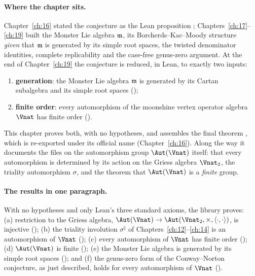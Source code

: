 \paragraph{Where the chapter sits.}  Chapter~\ref{ch:16} stated the
conjecture as the Lean proposition ; Chapters~\ref{ch:17}--\ref{ch:19} built the Monster
Lie algebra $\mathfrak m$, its Borcherds--Kac--Moody structure \emph{given} that $\mathfrak m$ is generated by its
simple root spaces, the twisted denominator identities, complete replicability and the case-free genus-zero
argument.  At the end of Chapter~\ref{ch:19} the conjecture is reduced, in Lean, to exactly two inputs:
\begin{enumerate}[label=(\Roman*)]
\item \textbf{generation}: the Monster Lie algebra $\mathfrak m$ is generated by its Cartan subalgebra and its
  simple root spaces ();
\item \textbf{finite order}: every automorphism of the moonshine vertex operator algebra $\Vnat$ has finite order
  ().
\end{enumerate}
This chapter proves both, with no hypotheses, and assembles the final theorem
, which is re-exported under its official name
 (Chapter~\ref{ch:16}).  Along the way it documents the files on the
automorphism group $\Aut(\Vnat)$ itself: that every automorphism is determined by its action on the Griess
algebra $\Vnat_2$, the triality automorphism $\sigma$, and the theorem that $\Aut(\Vnat)$ is a \emph{finite} group.

\paragraph{The results in one paragraph.}  With no hypotheses and only Lean's three standard axioms, the library
proves: (a) restriction to the Griess algebra, $\Aut(\Vnat)\to\Aut(\Vnat_2,\times,\langle\cdot,\cdot\rangle)$, is
injective (); (b) the triality involution $\sigma^\natural$ of
Chapters~\ref{ch:12}--\ref{ch:14} is an automorphism of $\Vnat$ (); (c) every automorphism of $\Vnat$
has finite order (); (d) $\Aut(\Vnat)$ is finite (); (e) the
Monster Lie algebra is generated by its simple root spaces (); and (f) the
genus-zero form of the Conway--Norton conjecture, as just described, holds for every automorphism of $\Vnat$
().

